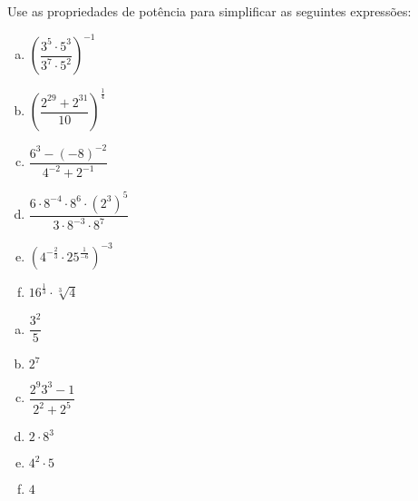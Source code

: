 \begin{exer}
 Use as propriedades de potência para simplificar as seguintes expressões:
\begin{multicols}{2}
\begin{enumerate}[a)]
\item $\left( \dfrac{3^5 \cdot 5^3}{3^7 \cdot 5^2} \right)^{-1}$
\item $\left( \dfrac{2^{29} + 2^{31}}{10} \right)^{\frac{1}{4}}$
\item $\dfrac{6^3 - (-8)^{-2}}{4^{-2} + 2^{-1}}$
\item $\dfrac{6 \cdot 8^{-4} \cdot 8^{6} \cdot (2^3)^{5}}{3 \cdot 8^{-3} \cdot 8^{7}}$
\item $\left(4^{-\frac{2}{3}} \cdot 25^{\frac{1}{-6}}\right)^{-3}$
\item $16^{\frac{1}{3}} \cdot \sqrt[3]{4}$
\end{enumerate}
\end{multicols}
\end{exer}
\begin{resp}
\begin{multicols}{6}
\begin{enumerate}[a)]
\item $\dfrac{3^2}{5}$
\item $2^{7}$
\item $\dfrac{2^9 3^3 - 1}{2^{2} + 2^{5}}$
\item $2 \cdot 8^3$
\item $4^2 \cdot 5$
\item $4$
\end{enumerate}
\end{multicols}
\end{resp}


